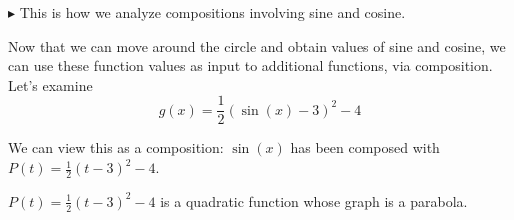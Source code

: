 \documentclass{ximera}
\begin{document}
\textbf{\textcolor{red!80!black}{$\blacktriangleright$}} This is how we analyze compositions involving sine and cosine.





























































Now that we can move around the circle and obtain values of sine and cosine, we can use these function values as input to additional functions, via composition. \\




Let's examine 
\[ g(x) = \frac{1}{2} (\sin(x) - 3)^2 - 4 \]


We can view this as a composition: $\sin(x)$ has been composed with $P(t) = \frac{1}{2} (t - 3)^2 - 4$.



$P(t) = \frac{1}{2} (t - 3)^2 - 4$ is a quadratic function whose graph is a parabola.
\end{document}

